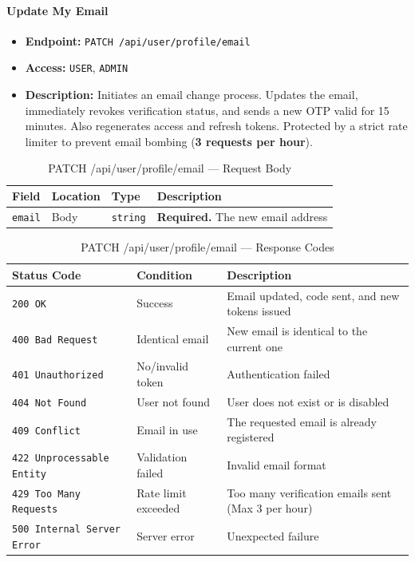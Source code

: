 \paragraph{Update My Email}
\label{subsubsec:update-my-email}

\begin{itemize}
  \item \textbf{Endpoint:} \texttt{PATCH /api/user/profile/email}
  \item \textbf{Access:} \texttt{USER}, \texttt{ADMIN}
  \item \textbf{Description:} Initiates an email change process. Updates the email, immediately revokes verification status, and sends a new OTP valid for 15 minutes. Also regenerates access and refresh tokens. Protected by a strict rate limiter to prevent email bombing (\textbf{3 requests per hour}).
\end{itemize}

\begin{table}[H]
\centering
\renewcommand{\arraystretch}{1.3}
\begin{tabularx}{\textwidth}{|l|l|l|X|}
\hline
\textbf{Field} & \textbf{Location} & \textbf{Type} & \textbf{Description} \\
\hline
\texttt{email} & Body & \texttt{string} & \textbf{Required.} The new email address \\
\hline
\end{tabularx}
\caption{PATCH /api/user/profile/email — Request Body}
\label{tab:update-my-email-body}
\end{table}

\begin{table}[H]
\centering
\renewcommand{\arraystretch}{1.3}
\begin{tabularx}{\textwidth}{|l|l|X|}
\hline
\textbf{Status Code} & \textbf{Condition} & \textbf{Description} \\
\hline
\texttt{200 OK}           & Success              & Email updated, code sent, and new tokens issued \\
\hline
\texttt{400 Bad Request}  & Identical email      & New email is identical to the current one \\
\hline
\texttt{401 Unauthorized} & No/invalid token     & Authentication failed \\
\hline
\texttt{404 Not Found}    & User not found       & User does not exist or is disabled \\
\hline
\texttt{409 Conflict}     & Email in use         & The requested email is already registered \\
\hline
\texttt{422 Unprocessable Entity} & Validation failed & Invalid email format \\
\hline
\texttt{429 Too Many Requests} & Rate limit exceeded & Too many verification emails sent (Max 3 per hour) \\
\hline
\texttt{500 Internal Server Error} & Server error & Unexpected failure \\
\hline
\end{tabularx}
\caption{PATCH /api/user/profile/email — Response Codes}
\label{tab:update-my-email-responses}
\end{table}
\FloatBarrier

